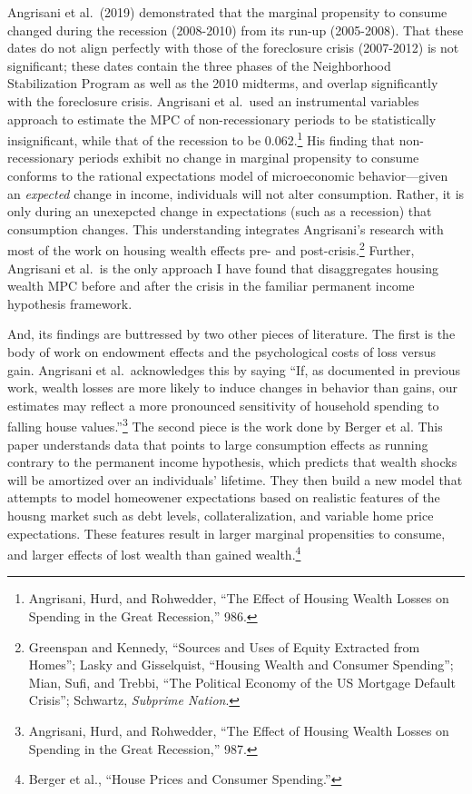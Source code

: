 \documentclass[
]{article}
\begin{document}
Angrisani et al.~(2019) demonstrated that the marginal propensity to consume changed during the recession (2008-2010) from its run-up (2005-2008).
That these dates do not align perfectly with those of the foreclosure crisis (2007-2012) is not significant; these dates contain the three phases of the Neighborhood Stabilization Program as well as the 2010 midterms, and overlap significantly with the foreclosure crisis.
Angrisani et al.~used an instrumental variables approach to estimate the MPC of non-recessionary periods to be statistically insignificant, while that of the recession to be 0.062.\footnote{Angrisani, Hurd, and Rohwedder, ``The Effect of Housing Wealth Losses on Spending in the Great Recession,'' 986.}
His finding that non-recessionary periods exhibit no change in marginal propensity to consume conforms to the rational expectations model of microeconomic behavior---given an \emph{expected} change in income, individuals will not alter consumption.
Rather, it is only during an unexepcted change in expectations (such as a recession) that consumption changes.
This understanding integrates Angrisani's research with most of the work on housing wealth effects pre- and post-crisis.\footnote{Greenspan and Kennedy, ``Sources and Uses of Equity Extracted from Homes''; Lasky and Gisselquist, ``Housing Wealth and Consumer Spending''; Mian, Sufi, and Trebbi, ``The Political Economy of the US Mortgage Default Crisis''; Schwartz, \emph{Subprime Nation}.}
Further, Angrisani et al.~is the only approach I have found that disaggregates housing wealth MPC before and after the crisis in the familiar permanent income hypothesis framework.

And, its findings are buttressed by two other pieces of literature.
The first is the body of work on endowment effects and the psychological costs of loss versus gain.
Angrisani et al.~acknowledges this by saying ``If, as documented in previous work, wealth losses are more likely to induce changes in behavior than gains, our estimates may reflect a more pronounced sensitivity of household spending to falling house values.''\footnote{Angrisani, Hurd, and Rohwedder, ``The Effect of Housing Wealth Losses on Spending in the Great Recession,'' 987.}
The second piece is the work done by Berger et al.
This paper understands data that points to large consumption effects as running contrary to the permanent income hypothesis, which predicts that wealth shocks will be amortized over an individuals' lifetime.
They then build a new model that attempts to model homeowener expectations based on realistic features of the housng market such as debt levels, collateralization, and variable home price expectations.
These features result in larger marginal propensities to consume, and larger effects of lost wealth than gained wealth.\footnote{Berger et al., ``House Prices and Consumer Spending.''}
\end{document}
